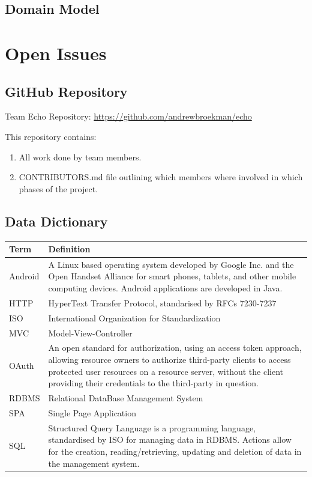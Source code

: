 \documentclass[a4paper,10pt]{article}
\begin{document}
\subsection{Domain Model}

\section{Open Issues}
\subsection {GitHub Repository}
Team Echo Repository: \url{https://github.com/andrewbroekman/echo}

This repository contains:
\begin{enumerate}
\item All work done by team members.
\item CONTRIBUTORS.md file outlining which members where involved in which phases of the project.
\end{enumerate}

\begin{appendices}
\newpage
\section{Data Dictionary}
\begin{tabu} to \textwidth { | X[l] | X[l] | }
	\hline
		\textbf{Term}		& \textbf{Definition}	\\ \hline \hline
		Android			& A Linux based operating system developed by Google Inc. and the Open Handset Alliance for smart phones, tablets, and other mobile computing devices. Android applications are developed in Java. \\ \hline
		HTTP			& HyperText Transfer Protocol, standarised by RFCs 7230-7237 \\ \hline
		ISO				& International Organization for Standardization \\ \hline
		MVC				& Model-View-Controller \\ \hline
		OAuth			& An open standard for authorization, using an access token approach, allowing resource owners to authorize third-party clients to access protected user resources on a resource server, without the client providing their credentials to the third-party in question. \\ \hline
		RDBMS			& Relational DataBase Management System \\ \hline
		SPA				& Single Page Application \\ \hline
		SQL				& Structured Query Language is a programming language, standardised by ISO for managing data in RDBMS. Actions allow for the creation, reading/retrieving, updating and deletion of data in the management system. \\ \hline
	\hline
\end{tabu}

\end{appendices}
\end{document}
